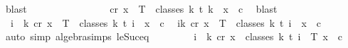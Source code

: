 \begin{isabellebody}
\ blast\isanewline
\ \ \ \ \ \ \isamarkupfalse%
\isanewline
\ \ \ \ \ \ \isamarkupfalse%
\ \isamarkupfalse%
\ {\isachardoublequoteopen}{\isasymexists}c{\isacharless}{\kern0pt}r{\isachardot}{\kern0pt}\ {\isasymforall}x\ {\isasymin}\ T\ {\isacharbackquote}{\kern0pt}\ classes\ {\isacharparenleft}{\kern0pt}k{\isacharplus}{\kern0pt}{}{\isacharparenright}{\kern0pt}\ t\ {\isacharparenleft}{\kern0pt}k{\isacharplus}{\kern0pt}{}{\isacharparenright}{\kern0pt}{\isachardot}{\kern0pt}\ {\isasymchi}\ x\ {\isacharequal}{\kern0pt}\ c{\isachardoublequoteclose}\ \isamarkupfalse%
\ blast\isanewline
\ \ \ \ \isamarkupfalse%
\isanewline
\ \ \ \ \isamarkupfalse%
\ \isamarkupfalse%
\ {\isachardoublequoteopen}\ {\isacharparenleft}{\kern0pt}{\isasymforall}i\ {\isasymin}\ {\isacharbraceleft}{\kern0pt}{\isachardot}{\kern0pt}{\isachardot}{\kern0pt}k{\isacharplus}{\kern0pt}{}{\isacharbraceright}{\kern0pt}{\isachardot}{\kern0pt}\ {\isasymexists}c{\isacharless}{\kern0pt}r{\isachardot}{\kern0pt}\ {\isasymforall}x\ {\isasymin}\ T\ {\isacharbackquote}{\kern0pt}\ classes\ {\isacharparenleft}{\kern0pt}k{\isacharplus}{\kern0pt}{}{\isacharparenright}{\kern0pt}\ t\ i{\isachardot}{\kern0pt}\ {\isasymchi}\ x\ {\isacharequal}{\kern0pt}\ c{\isacharparenright}{\kern0pt}{\isachardoublequoteclose}\ \isamarkupfalse%
\ {\isacartoucheopen}{\isasymforall}i{\isasymle}k{\isachardot}{\kern0pt}\ {\isasymexists}c{\isacharless}{\kern0pt}r{\isachardot}{\kern0pt}\ {\isasymforall}x\ {\isasymin}\ T\ {\isacharbackquote}{\kern0pt}\ classes\ {\isacharparenleft}{\kern0pt}k{\isacharplus}{\kern0pt}{}{\isacharparenright}{\kern0pt}\ t\ i{\isachardot}{\kern0pt}\ {\isasymchi}\ x\ {\isacharequal}{\kern0pt}\ c{\isacartoucheclose}\ \isamarkupfalse%
\ {\isacharparenleft}{\kern0pt}auto\ simp{\isacharcolon}{\kern0pt}\ algebra{\isacharunderscore}{\kern0pt}simps\ le{\isacharunderscore}{\kern0pt}Suc{\isacharunderscore}{\kern0pt}eq{\isacharparenright}{\kern0pt}\ \isanewline
\ \ \ \ \isamarkupfalse%
\ \isamarkupfalse%
\ {\isachardoublequoteopen}{\isacharparenleft}{\kern0pt}{\isasymforall}i\ {\isasymin}\ {\isacharbraceleft}{\kern0pt}{\isachardot}{\kern0pt}{\isachardot}{\kern0pt}k{\isacharplus}{\kern0pt}{}{\isacharbraceright}{\kern0pt}{\isachardot}{\kern0pt}\ {\isasymexists}c{\isacharless}{\kern0pt}r{\isachardot}{\kern0pt}\ {\isasymforall}x\ {\isasymin}\ classes\ {\isacharparenleft}{\kern0pt}k{\isacharplus}{\kern0pt}{}{\isacharparenright}{\kern0pt}\ t\ i{\isachardot}{\kern0pt}\ {\isasymchi}\ {\isacharparenleft}{\kern0pt}T\ x{\isacharparenright}{\kern0pt}\ {\isacharequal}{\kern0pt}\ c{\isacharparenright}{\kern0pt}{\isachardoublequoteclose}\ \isamarkupfalse%

\end{isabellebody}
